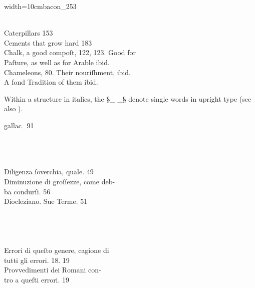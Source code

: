 

\begin{sampleImageSmall}[ 1]{width=10cm}{bacon_253}

\begin{typeLatin}
 \\
Caterpillars \bold{#} \bold{_}153\bold{_} \\
Cements that grow hard \bold{#} \bold{_}183\bold{_} \\
Chalk, a good compoſt, \bold{_}122, 123\bold{_}. Good for \\
\bold{#} Paſture, as well as for Arable \bold{#} \bold{_}ibid\bold{_}. \\
Chameleons, \bold{_}80\bold{_}. Their nouriſhment, \bold{#} \bold{_}ibid\bold{_}. \\
\bold{#} A fond Tradition of them \bold{#} \bold{_}ibid\bold{_}. \\
\end{typeLatin}
\end{sampleImageSmall}

\begin{crossref}
Within a structure in italics, the §_ _§ denote single words in upright type (see also ).
\end{crossref}

\begin{sampleImage}[ 2]{gallac_91}

\begin{typeLatin}
 \\
 \\
\someText \\
Diligenza ſoverchia, quale. \bold{#} 49 \\
Diminuzione di groſſezze, come deb- \\
\bold{#} ba condurſi. \bold{#} 56 \\
\bold{_}Diocleziano\bold{_}. Sue Terme. \bold{#} 51 \\
\someText \\
 \\
 \\
\someText \\
Errori di queſto genere, cagione di \\
\bold{#} tutti gli errori. \bold{#} 18. 19 \\
\bold{#} Provvedimenti dei Romani con- \\
\bold{#} tro a queſti errori. \bold{#} 19 \\
\someText \\
 \\
 \\
\end{typeLatin}
\end{sampleImage}


